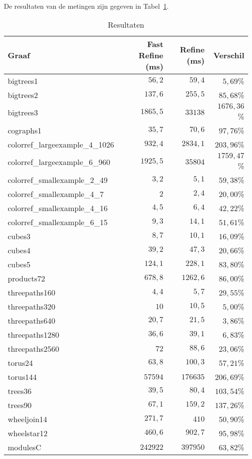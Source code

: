 \documentclass[twoside]{article}
\begin{document}
\begin{multicols}{2}
De resultaten van de metingen zijn gegeven in Tabel~\ref{table:resultaten}.
\begin{table}[H]
\caption{Resultaten}\label{table:resultaten}
\centering
\begin{tabular}{lrrr}
\toprule
Graaf & Fast Refine (ms) & Refine (ms) & Verschil \\
\midrule
\midrule
bigtrees1 & $56,2$ & $59,4$ & $5,69$\% \\
bigtrees2 & $137,6$ & $255,5$ & $85,68$\% \\
bigtrees3 & $1865,5$ & $33138$ & $1676,36$\% \\
cographs1 & $35,7$ & $70,6$ & $97,76$\% \\
colorref\_largeexample\_4\_1026 & $932,4$ & $2834,1$ & $203,96$\% \\
colorref\_largeexample\_6\_960 & $1925,5$ & $35804$ & $1759,47$\% \\
colorref\_smallexample\_2\_49 & $3,2$ & $5,1$ & $59,38$\% \\
colorref\_smallexample\_4\_7 & $2$ & $2,4$ & $20,00$\% \\
colorref\_smallexample\_4\_16 & $4,5$ & $6,4$ & $42,22$\% \\
colorref\_smallexample\_6\_15 & $9,3$ & $14,1$ & $51,61$\% \\
cubes3 & $8,7$ & $10,1$ & $16,09$\% \\
cubes4 & $39,2$ & $47,3$ & $20,66$\% \\
cubes5 & $124,1$ & $228,1$ & $83,80$\% \\
products72 & $678,8$ & $1262,6$ & $86,00$\% \\
threepaths160 & $4,4$ & $5,7$ & $29,55$\% \\
threepaths320 & $10$ & $10,5$ & $5,00$\% \\
threepaths640 & $20,7$ & $21,5$ & $3,86$\% \\
threepaths1280 & $36,6$ & $39,1$ & $6,83$\% \\
threepaths2560 & $72$ & $88,6$ & $23,06$\% \\
torus24 & $63,8$ & $100,3$ & $57,21$\% \\
torus144 & $57594$ & $176635$ & $206,69$\% \\
trees36 & $39,5$ & $80,4$ & $103,54$\% \\
trees90 & $67,1$ & $159,2$ & $137,26$\% \\
wheeljoin14 & $271,7$ & $410$ & $50,90$\% \\
wheelstar12 & $460,6$ & $902,7$ & $95,98$\% \\
modulesC & $242922$ & $397950$ & $63,82$\% \\


\end{tabular}
\end{table}
\end{multicols}
\end{document}
